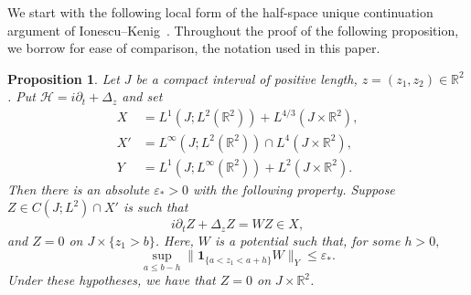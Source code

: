 \documentclass[11pt]{amsart}
\newtheorem{proposition}[theorem]{Proposition}
\theoremstyle{remark}
\newcommand{\R}{\mathbb R}
\newcommand{\HH}{\mathcal H}
\newcommand{\1}{\mathbf 1}
\begin{document}
We start with the following local form of the half-space unique continuation argument of
Ionescu--Kenig~\cite{IonescuKenig}. Throughout the proof of the following proposition, we borrow for ease of comparison, the notation used in this paper.

\begin{proposition}
\label{prop:strip-propagation}
Let $J$ be a compact interval of positive length, $z=(z_1,z_2)\in\R^2$.
Put $\HH=i\partial_t+\Delta_z$ and set
\begin{align*}
 X&=L^1(J;L^2(\R^2))+L^{4/3}(J\times\R^2),\\
 X'&=L^\infty(J;L^2(\R^2))\cap L^4(J\times\R^2),\\
 Y&=L^1(J;L^\infty(\R^2))+L^2(J\times\R^2).
\end{align*}
Then there is an absolute $\varepsilon_*>0$ with the following
property.  Suppose
$Z\in C(J;L^2)\cap X'$ is such that
\[
i\partial_tZ+\Delta_zZ=WZ\in X,
\]
and $Z=0$ on $J\times\{z_1>b\}$.  Here, $W$ is a potential such that, for some $h>0,$
\[
 \sup_{a\le b-h}
 \|\1_{\{a<z_1<a+h\}}W\|_Y\le\varepsilon_*.
 \tag{1.3}\label{eq:strip-smallness}
\]
Under these hypotheses, we have that $Z=0$ on $J\times\R^2$.
\end{proposition}
\end{document}
